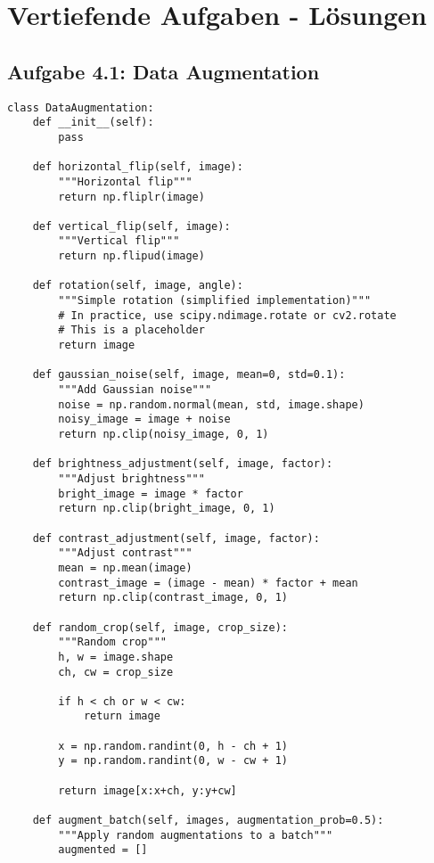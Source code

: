 ﻿\documentclass[12pt,a4paper]{article}
\begin{document}
\section{Vertiefende Aufgaben - Lösungen}

\subsection{Aufgabe 4.1: Data Augmentation}

\begin{lstlisting}
class DataAugmentation:
    def __init__(self):
        pass
    
    def horizontal_flip(self, image):
        """Horizontal flip"""
        return np.fliplr(image)
    
    def vertical_flip(self, image):
        """Vertical flip"""
        return np.flipud(image)
    
    def rotation(self, image, angle):
        """Simple rotation (simplified implementation)"""
        # In practice, use scipy.ndimage.rotate or cv2.rotate
        # This is a placeholder
        return image
    
    def gaussian_noise(self, image, mean=0, std=0.1):
        """Add Gaussian noise"""
        noise = np.random.normal(mean, std, image.shape)
        noisy_image = image + noise
        return np.clip(noisy_image, 0, 1)
    
    def brightness_adjustment(self, image, factor):
        """Adjust brightness"""
        bright_image = image * factor
        return np.clip(bright_image, 0, 1)
    
    def contrast_adjustment(self, image, factor):
        """Adjust contrast"""
        mean = np.mean(image)
        contrast_image = (image - mean) * factor + mean
        return np.clip(contrast_image, 0, 1)
    
    def random_crop(self, image, crop_size):
        """Random crop"""
        h, w = image.shape
        ch, cw = crop_size
        
        if h < ch or w < cw:
            return image
        
        x = np.random.randint(0, h - ch + 1)
        y = np.random.randint(0, w - cw + 1)
        
        return image[x:x+ch, y:y+cw]
    
    def augment_batch(self, images, augmentation_prob=0.5):
        """Apply random augmentations to a batch"""
        augmented = []
        

\end{lstlisting}
\end{document}
